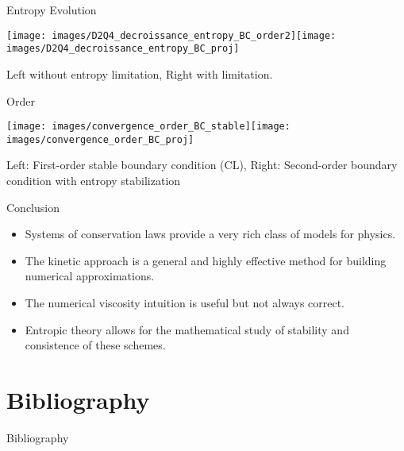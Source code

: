 \documentclass[english]{beamer}
\begin{document}
\begin{frame}{Entropy Evolution}

\texttt{[image: images/D2Q4\_decroissance\_entropy\_BC\_order2]}\texttt{[image: images/D2Q4\_decroissance\_entropy\_BC\_proj]}

Left without entropy limitation, Right with limitation.
\end{frame}

\begin{frame}{Order}

\texttt{[image: images/convergence\_order\_BC\_stable]}\texttt{[image: images/convergence\_order\_BC\_proj]}

Left: First-order stable boundary condition (CL), Right: Second-order boundary condition with entropy stabilization
\end{frame}
%
\begin{frame}{Conclusion}
\begin{itemize}
\item Systems of conservation laws provide a very rich class of models for physics.
\item The kinetic approach is a general and highly effective method for building numerical approximations.
\item The numerical viscosity intuition is useful but not always correct.
\item Entropic theory allows for the mathematical study of stability and consistence of these schemes.
\end{itemize}
\end{frame}

\section{Bibliography}
\begin{frame}[allowframebreaks]{Bibliography}

\tiny


\end{frame}
%
\end{document}
